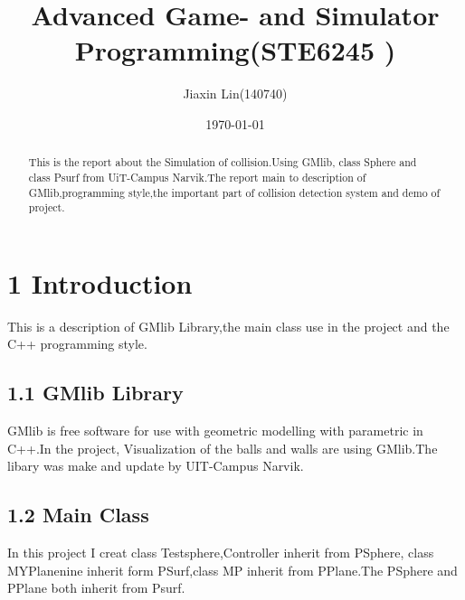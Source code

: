 \documentclass[a4,10pt]{article}
\title{Advanced Game- and Simulator Programming(STE6245 )}
\author{Jiaxin Lin(140740)}
\date{\today}
\begin{document}
  \maketitle

  \begin{abstract}
   This is the report about the Simulation of collision.Using GMlib, class Sphere and class Psurf from UiT-Campus Narvik.The report main to
description of GMlib,programming style,the important part of collision detection system
 and demo of project.
   
  \end{abstract}


 
  \section{1 Introduction}
This is a description of GMlib Library,the main class use in the project and the C++ programming style. 
 \subsection*{1.1 GMlib Library}
GMlib is free software for use with geometric modelling with parametric in C++.In the project,
Visualization of the balls and walls are using GMlib.The libary was make and update by UIT-Campus Narvik.

   \subsection*{1.2 Main Class}
In this project I creat class Testsphere,Controller inherit from PSphere, class MYPlanenine inherit form PSurf,class MP inherit from PPlane.The PSphere and PPlane both inherit from Psurf.
\end{document}
